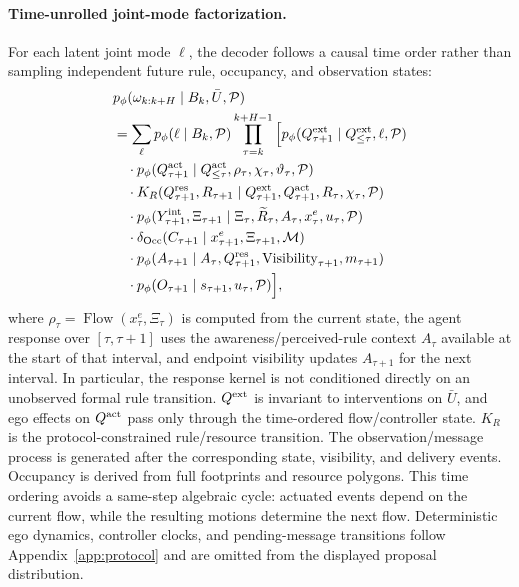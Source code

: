 \documentclass[letterpaper]{article} %
\begin{document}
\paragraph{Time-unrolled joint-mode factorization.}
For each latent joint mode $\ell$, the decoder follows a causal time order rather than sampling independent future rule, occupancy, and observation states:
\begin{align}
&p_\phi(\omega_{k:k+H}\mid B_k,\bar U,\mathcal P)\nonumber\\
&=\sum_\ell p_\phi(\ell\mid B_k,\mathcal P)
\prod_{\tau=k}^{k+H-1}
\Big[
p_\phi(Q_{\tau+1}^{\rm ext}\mid Q_{\leq\tau}^{\rm ext},\ell,\mathcal P)\nonumber\\
&\quad\cdot p_\phi(Q_{\tau+1}^{\rm act}\mid Q_{\leq\tau}^{\rm act},
 \rho_\tau,\chi_\tau,\vartheta_\tau,\mathcal P)\nonumber\\
&\quad\cdot K_R(Q_{\tau+1}^{\rm res},R_{\tau+1}\mid
 Q_{\tau+1}^{\rm ext},Q_{\tau+1}^{\rm act},R_\tau,\chi_\tau,\mathcal P)\nonumber\\
&\quad\cdot p_\phi(Y_{\tau+1}^{\rm int},\Xi_{\tau+1}\mid
 \Xi_\tau,\widetilde R_\tau,A_\tau,x_\tau^e,u_\tau,\mathcal P)\nonumber\\
&\quad\cdot \delta_{\operatorname{Occ}}(C_{\tau+1}\mid
 x_{\tau+1}^e,\Xi_{\tau+1},\mathcal M)\nonumber\\
&\quad\cdot p_\phi(A_{\tau+1}\mid A_\tau,Q_{\tau+1}^{\rm res},
 \operatorname{Visibility}_{\tau+1},m_{\tau+1})\nonumber\\
&\quad\cdot p_\phi(O_{\tau+1}\mid s_{\tau+1},u_\tau,\mathcal P)
\Big],
\label{eq:joint-factor-expanded}
\end{align}
where $\rho_\tau=\operatorname{Flow}(x_\tau^e,\Xi_\tau)$ is computed from the current state, the agent response over $[\tau,\tau+1]$ uses the awareness/perceived-rule context $A_\tau$ available at the start of that interval, and endpoint visibility updates $A_{\tau+1}$ for the next interval. In particular, the response kernel is not conditioned directly on an unobserved formal rule transition. $Q^{\rm ext}$ is invariant to interventions on $\bar U$, and ego effects on $Q^{\rm act}$ pass only through the time-ordered flow/controller state. $K_R$ is the protocol-constrained rule/resource transition. The observation/message process is generated after the corresponding state, visibility, and delivery events. Occupancy is derived from full footprints and resource polygons. This time ordering avoids a same-step algebraic cycle: actuated events depend on the current flow, while the resulting motions determine the next flow. Deterministic ego dynamics, controller clocks, and pending-message transitions follow Appendix~\ref{app:protocol} and are omitted from the displayed proposal distribution.
\end{document}
